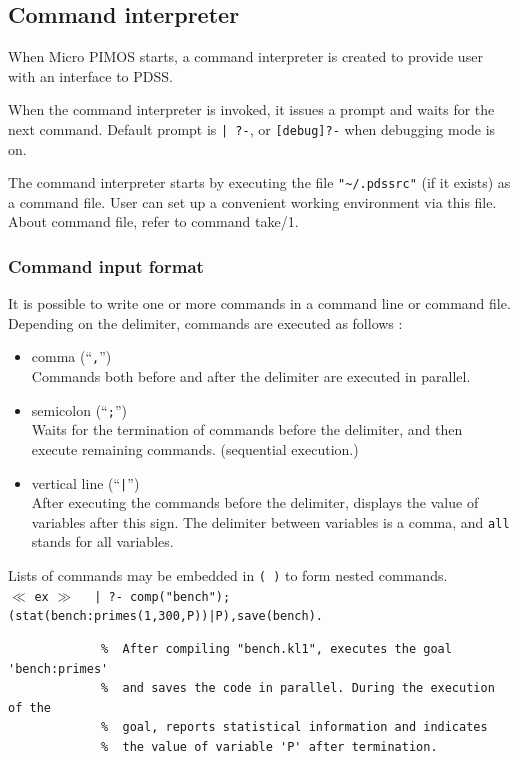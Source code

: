 \subsection{Command interpreter}
\label{sec-MPIMOS-shell}

When  Micro PIMOS starts, a command interpreter is created to provide 
user with an interface to PDSS.

When the command interpreter is invoked, it issues a prompt and waits
for the next command. Default prompt is \verb!| ?-!, or \verb|[debug]?-| 
when debugging mode is on.

The command interpreter starts by executing the file \verb|"~/.pdssrc"| (if it 
exists) as a command file. User can set up a convenient working 
environment via this file. About command file, refer to command take/1.

\subsubsection{Command input format}

It is possible to write one or more commands in a command line or command file.
Depending on the delimiter, commands are executed as follows :
\begin{itemize}
\item comma (``\verb|,|'')\\ \index{\verb|,|}
Commands both before and after the delimiter are executed in parallel.
\item semicolon (``\verb|;|'')\\ \index{\verb|;|}
Waits for the termination of commands before the delimiter, and then execute 
remaining commands. (sequential execution.)
\item vertical line (``\verb!|!'')\\ \index{\verb!|!}
After executing the commands before the delimiter, displays the value of 
variables after this sign. The delimiter between variables is a comma,
and \verb|all| stands for all variables.
\end{itemize}
Lists of commands may be embedded in \verb|( )| to form nested commands.
\\
$\ll$ \verb|ex| $\gg$ 
\verb!  | ?- comp("bench");(stat(bench:primes(1,300,P))|P),save(bench).!
\begin{verbatim}
             %  After compiling "bench.kl1", executes the goal 'bench:primes' 
             %  and saves the code in parallel. During the execution of the
             %  goal, reports statistical information and indicates
             %  the value of variable 'P' after termination.
\end{verbatim}

